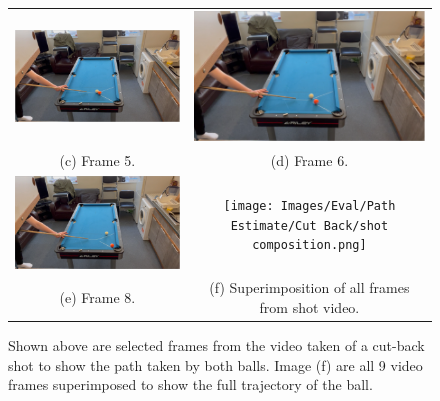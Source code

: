 \documentclass[ %
                author={Finn Alexander Wilkinson},
                supervisor={Dr. Andrew Calway},
                degree={MEng},
                title={\centering A Mixed Reality Aim Assistant for Pool and Snooker},
                subtitle={},
                type={Enterprise},
                year={2021} ]{dissertation}
\begin{document}
\begin{figure}[h!]
\begin{tabular}{cc}
         \includegraphics[scale = 0.15]{Images/Eval/Path Estimate/Cut Back/Frame 5.PNG} & \includegraphics[scale = 0.15]{Images/Eval/Path Estimate/Cut Back/Frame 6.PNG} \\ 
         (c) Frame 5. & (d) Frame 6. \\ [6pt]
         \includegraphics[scale = 0.15]{Images/Eval/Path Estimate/Cut Back/Frame 8.PNG} & \texttt{[image: Images/Eval/Path Estimate/Cut Back/shot composition.png]} \\
         (e) Frame 8. & (f) Superimposition of all frames from shot video.\\
    \end{tabular}
    \caption{Shown above are selected frames from the video taken of a cut-back shot to show the path taken by both balls. Image (f) are all 9 video frames superimposed to show the full trajectory of the ball.}
    \label{fig:evalCutBackShot}
\end{figure}
\end{document}
